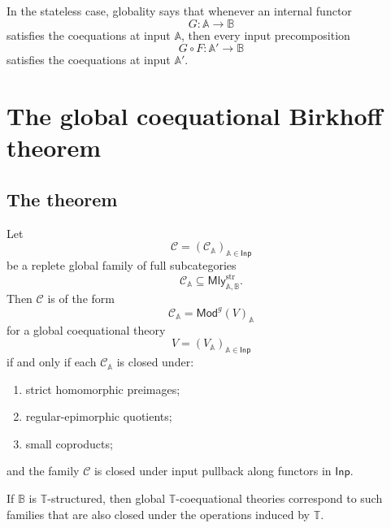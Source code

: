 In the stateless case, globality says that whenever an internal functor
\[
    G:\mathbb A\to\mathbb B
\]
satisfies the coequations at input \(\mathbb A\), then every input
precomposition
\[
    G\circ F:\mathbb A'\to\mathbb B
\]
satisfies the coequations at input \(\mathbb A'\).

\section{The global coequational Birkhoff theorem}
\label{sec:global-coequational-birkhoff}

\subsection{The theorem}
\label{subsec:global-coequational-birkhoff-theorem}

\begin{theorem}
\label{thm:global-coequational-birkhoff}
    Let
    \[
        \mathcal C=(\mathcal C_{\mathbb A})_{\mathbb A\in\mathsf{Inp}}
    \]
    be a replete global family of full subcategories
    \[
        \mathcal C_{\mathbb A}
        \subseteq
        \mathsf{Mly}^{\mathrm{str}}_{\mathbb A,\mathbb B}.
    \]
    Then \(\mathcal C\) is of the form
    \[
        \mathcal C_{\mathbb A}
        =
        \mathsf{Mod}^{g}(V)_{\mathbb A}
    \]
    for a global coequational theory
    \[
        V=(V_{\mathbb A})_{\mathbb A\in\mathsf{Inp}}
    \]
    if and only if each \(\mathcal C_{\mathbb A}\) is closed under:
    \begin{enumerate}
        \item strict homomorphic preimages;
        \item regular-epimorphic quotients;
        \item small coproducts;
    \end{enumerate}
    and the family \(\mathcal C\) is closed under input pullback along functors
    in \(\mathsf{Inp}\).

    If \(\mathbb B\) is \(\mathbb T\)-structured, then global
    \(\mathbb T\)-coequational theories correspond to such families that are
    also closed under the operations induced by \(\mathbb T\).
\end{theorem}

